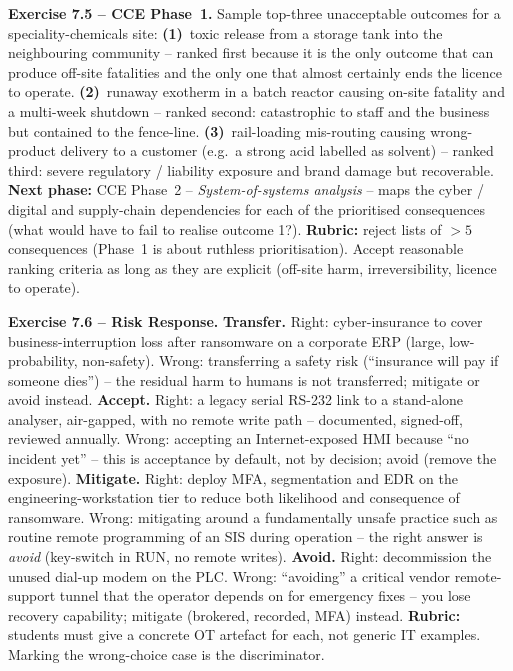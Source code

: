 \documentclass[11pt,a4paper]{article}
\begin{document}
\begin{solutionbox}
\textbf{Exercise 7.5 -- CCE Phase~1.}
Sample top-three unacceptable outcomes for a speciality-chemicals site:
\textbf{(1)}~toxic release from a storage tank into the neighbouring
community -- ranked first because it is the only outcome that can
produce off-site fatalities and the only one that almost certainly
ends the licence to operate.
\textbf{(2)}~runaway exotherm in a batch reactor causing on-site fatality
and a multi-week shutdown -- ranked second: catastrophic to staff and
the business but contained to the fence-line.
\textbf{(3)}~rail-loading mis-routing causing wrong-product delivery
to a customer (e.g.\ a strong acid labelled as solvent) -- ranked
third: severe regulatory / liability exposure and brand damage but
recoverable.
\textbf{Next phase:} CCE Phase~2 -- \emph{System-of-systems analysis}
-- maps the cyber / digital and supply-chain dependencies for each of
the prioritised consequences (what would have to fail to realise
outcome 1?).
\textbf{Rubric:} reject lists of $>5$ consequences (Phase~1 is about
ruthless prioritisation). Accept reasonable ranking criteria as long as
they are explicit (off-site harm, irreversibility, licence to operate).
\end{solutionbox}

\begin{solutionbox}
\textbf{Exercise 7.6 -- Risk Response.}
\textbf{Transfer.} Right: cyber-insurance to cover business-interruption
loss after ransomware on a corporate ERP (large, low-probability,
non-safety). Wrong: transferring a safety risk (``insurance will pay
if someone dies'') -- the residual harm to humans is not transferred;
mitigate or avoid instead.
\textbf{Accept.} Right: a legacy serial RS-232 link to a stand-alone
analyser, air-gapped, with no remote write path -- documented,
signed-off, reviewed annually. Wrong: accepting an Internet-exposed
HMI because ``no incident yet'' -- this is acceptance by default,
not by decision; avoid (remove the exposure).
\textbf{Mitigate.} Right: deploy MFA, segmentation and EDR on the
engineering-workstation tier to reduce both likelihood and consequence
of ransomware. Wrong: mitigating around a fundamentally unsafe
practice such as routine remote programming of an SIS during operation
-- the right answer is \emph{avoid} (key-switch in RUN, no remote writes).
\textbf{Avoid.} Right: decommission the unused dial-up modem on the
PLC. Wrong: ``avoiding'' a critical vendor remote-support tunnel that
the operator depends on for emergency fixes -- you lose recovery
capability; mitigate (brokered, recorded, MFA) instead.
\textbf{Rubric:} students must give a concrete OT artefact for each,
not generic IT examples. Marking the wrong-choice case is the
discriminator.
\end{solutionbox}
\end{document}
